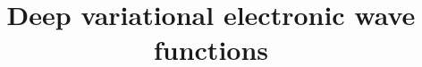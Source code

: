 

\title{Deep variational electronic wave functions}



\twocolumn[{%
  \maketitle
  \vspace{1em}
}]




% 


